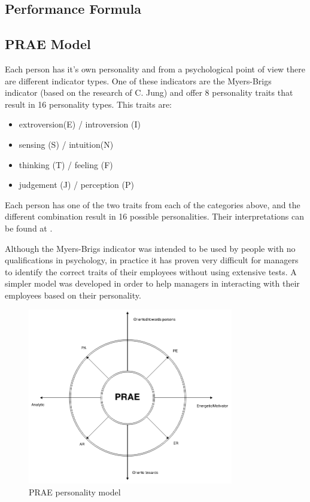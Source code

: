 
\subsection{Performance Formula}
\label{sub-sec:formula}
 \newline

\subsection{PRAE Model}
\label{sub-sec:prae}


Each person has it's own personality and from a psychological point of view there are different indicator types. One of these indicators are the Myers-Brigs indicator \cite{myers} (based on the research of C. Jung) and offer 8 personality traits that result in 16 personality types. This traits are:
\begin{itemize}
\item extroversion(E) / introversion (I)
\item sensing (S) / intuition(N)
\item thinking (T) / feeling (F) 
\item judgement (J) / perception (P)
\end{itemize}
Each person has one of the two traits from each of the categories above, and the different combination result in 16 possible personalities. Their interpretations can be found at \cite{mbf}.

Although the Myers-Brigs indicator was intended to be used by people with no qualifications in psychology, in practice it has proven very difficult for managers to identify the correct traits of their employees without using extensive tests. A simpler model was developed in order to help managers in interacting with their employees based on their personality. 

\begin{figure}[h]
\centering
\includegraphics[width=0.8\textwidth]{img/prae.png}
\caption{PRAE personality model}
\label{fig:prae}
\end{figure}

